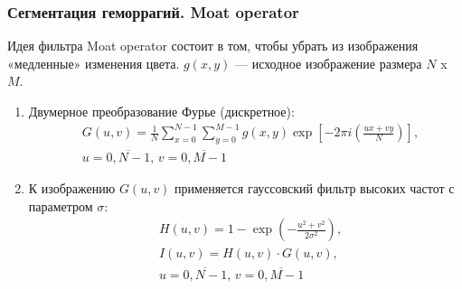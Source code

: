 \documentclass{beamer}
\begin{document}
\begin{frame}
	\frametitle{Сегментация геморрагий. Moat operator}
	{\footnotesize Идея фильтра Moat operator состоит в том, чтобы убрать из изображения «медленные» изменения цвета.
	\newline
	$g(x, y)$ --- исходное изображение размера $N$ x $M$.}
	\scriptsize
	\begin{enumerate}
		\item Двумерное преобразование Фурье (дискретное): \begin{equation}
		\begin{split}
		&G(u, v) = \frac{1}{N} \sum\limits_{x=0}^{N - 1} \sum\limits_{y=0}^{M - 1} g(x, y) \exp\left[  -2\pi i \left( \frac{ux + vy}{N} \right) \right], \\ \nonumber
		&u =\overline{0, N - 1},\, v = \overline{0, M - 1}
		\end{split}
		\end{equation}
		
		\item К изображению $G(u, v)$ применяется гауссовский фильтр высоких частот с параметром $\sigma$:
		\begin{equation}
		\begin{split}
		&H(u, v) = 1 - \exp\left( -\frac{u^2 + v^2}{2\sigma^2} \right), \\ \nonumber
		&I(u, v) = H(u, v) \cdot G(u, v), \\
		&u =\overline{0, N - 1}, \,v = \overline{0, M - 1}
		\end{split}
		\end{equation}
		
	\end{enumerate}
	\normalsize
	
\end{frame}

\end{document}
